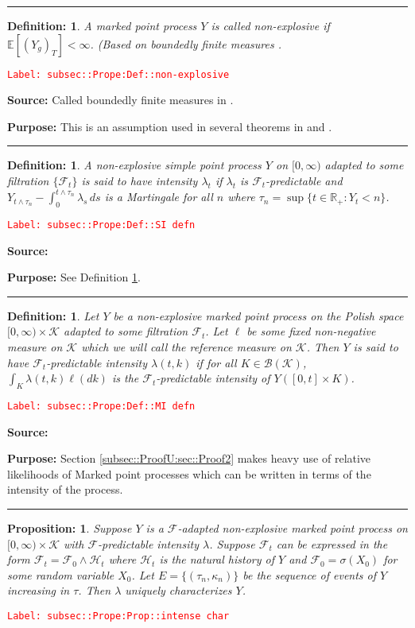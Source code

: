 \documentclass[12pt]{article}
\newcommand{\mb}{\mathbb}
\newcommand{\mc}{\mathcal}
\newcommand{\ms}{\mathscr}
\newcommand{\tr}{\textcolor{red}}
\newcommand{\labe}[1]{\tr{\texttt{Label: #1}}}
\newcommand{\purpose}{\textbf{Purpose: }}
\newcommand{\lin}{\rule{\linewidth}{0.4 pt}}
\newcommand{\ex}[1]{\mb{E}\left[#1\right]}			%
\newtheorem{prop}[thms]{Proposition: }
\newtheorem{defn}[thms]{Definition: }
\begin{document}
\lin

\begin{defn}
A marked point process \(Y\) is called non-explosive if \(\ex{(Y_g)_T} < \infty\). (Based on boundedly finite measures \cite[Definition 9.1.I]{DalVer08}.
\label{subsec::Prope:Def::non-explosive}
\end{defn}
\labe{subsec::Prope:Def::non-explosive}

\textbf{Source: } Called boundedly finite measures in \cite[Definition 9.1.I]{DalVer08}.

\purpose This is an assumption used in several theorems in \cite{DalVer03} and \cite{DalVer08}.

\lin

\begin{defn}
A non-explosive simple point process \(Y\) on \([0,\infty)\) adapted to some filtration \(\{\mc{F}_t\}\) is said to have intensity \(\lambda_t\) if \(\lambda_t\) is \(\mc{F}_t\)-predictable and \(Y_{t\wedge \tau_n} - \int_0^{t\wedge \tau_n} \lambda_s\,ds\) is a Martingale for all \(n\) where \(\tau_n = \sup\{t \in \mb{R}_+: Y_t < n\}\). 
\label{subsec::Prope:Def::SI defn}
\end{defn}
\labe{subsec::Prope:Def::SI defn}

\textbf{Source: } \cite[Definitions 14.3.I,14.1.I]{DalVer08}

\purpose See Definition \ref{subsec::Prope:Def::MI defn}.

\lin

\begin{defn}
Let \(Y\) be a non-explosive marked point process on the Polish space \([0,\infty)\times \mc{K}\) adapted to some filtration \(\mc{F}_t\). Let \(\ell\) be some fixed non-negative measure on \(\mc{K}\) which we will call the reference measure on \(\mc{K}\). Then \(Y\) is said to have \(\mc{F}_t\)-predictable intensity \(\lambda(t,k)\) if for all \(K \in \ms{B}(\mc{K})\), \(\int_K \lambda(t,k)\ell(dk)\) is the \(\mc{F}_t\)-predictable intensity of \(Y([0,t]\times K)\). 
\label{subsec::Prope:Def::MI defn}
\end{defn}
\labe{subsec::Prope:Def::MI defn}

\textbf{Source: }\cite[Definition 14.3.I]{DalVer08}

\purpose Section \ref{subsec::ProofU:sec::Proof2} makes heavy use of relative likelihoods of Marked point processes which can be written in terms of the intensity of the process.

\lin

\begin{prop}
Suppose \(Y\) is a \(\mc{F}\)-adapted non-explosive marked point process on \([0,\infty)\times \mc{K}\) with \(\mc{F}\)-predictable intensity \(\lambda\). Suppose \(\mc{F}_t\) can be expressed in the form \(\mc{F}_t = \mc{F}_0\wedge \mc{H}_t\) where \(\mc{H}_t\) is the natural history of \(Y\) and \(\mc{F}_0 = \sigma(X_0)\) for some random variable \(X_0\). Let \(E = \{(\tau_n,\kappa_n)\}\) be the sequence of events of \(Y\) increasing in \(\tau\). Then \(\lambda\) uniquely characterizes \(Y\).
\label{subsec::Prope:Prop::intense char}
\end{prop}
\labe{subsec::Prope:Prop::intense char}
\end{document}
